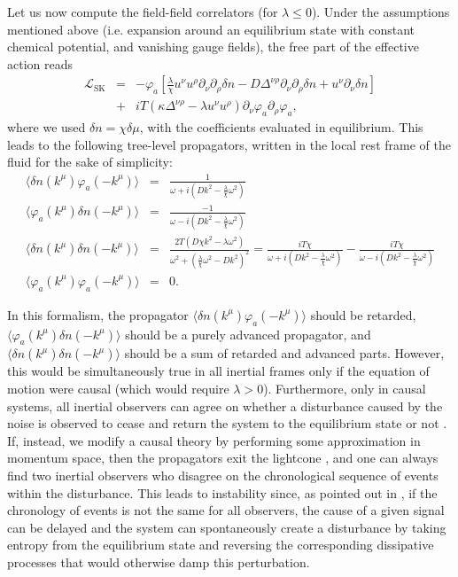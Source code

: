 \documentclass[aps,prd,nofootinbib,amsmath,amssymb,showpacs,longbibliography,singlecolumn,superscriptaddress,notitlepage]{revtex4-1}
\theoremstyle{plain}
\theoremstyle{definition}
\newcommand{\bea}{\begin{eqnarray}}
\newcommand{\eea}{\end{eqnarray}}
\begin{document}
Let us now compute the field-field correlators (for $\lambda \leq 0$). Under the assumptions mentioned above (i.e. expansion around an equilibrium state with constant chemical potential, and vanishing gauge fields),  the free part of the effective action reads
\begin{eqnarray}
    \mathcal{L}_{\mathrm{SK}} &=& -\varphi_a \left[\frac{\lambda}{\chi}  u^\nu u^\rho \partial_\nu\partial_\rho \delta n - D \Delta^{\nu\rho}\partial_\nu\partial_\rho \delta n +  u^\nu \partial_\nu \delta n  \right] \\ \nonumber &+& i T (\kappa \Delta^{\nu\rho}-\lambda u^\nu u^\rho)\partial_\nu \varphi_a \partial_\rho \varphi_a,
    \label{SKaction}
    \end{eqnarray}
where we used $\delta n = \chi \delta \mu$, with the coefficients evaluated in equilibrium. This leads to the following tree-level propagators, written in the local rest frame of the fluid for the sake of simplicity:
\bea
\langle \delta n(k^{\mu})\varphi_a(-k^{\mu})\rangle &=& \frac{1}{\omega + i \left(D k^2 - \frac{\lambda}{\chi}\omega^2\right)}\nonumber \\
\langle \varphi_a(k^{\mu}) \delta n(-k^{\mu})\rangle &=& \frac{-1}{\omega - i \left(D k^2 - \frac{\lambda}{\chi}\omega^2\right)}\nonumber \\
\langle \delta n(k^{\mu}) \delta n(-k^{\mu})\rangle &=& \frac{2T\left(D \chi k^2-\lambda \omega^2\right)}{\omega^2 + \left(\frac{\lambda}{\chi}\omega^2-D k^2\right)^2} = \frac{i T\chi}{\omega + i \left(D k^2 - \frac{\lambda}{\chi}\omega^2\right)}-\frac{i T\chi}{\omega -i \left(D k^2 - \frac{\lambda}{\chi}\omega^2\right)}\nonumber \\ 
\langle \varphi_a(k^{\mu}) \varphi_a(-k^{\mu})\rangle &=& 0.
\label{propagators}
\eea

In this formalism, the propagator $\langle \delta n(k^{\mu}) \varphi_a(-k^{\mu})\rangle$ should be retarded,  $\langle \varphi_a(k^{\mu}) \delta n(-k^{\mu})\rangle$ should be a purely advanced propagator, and $\langle \delta n(k^{\mu}) \delta n(-k^{\mu})\rangle$ should be a sum of retarded and advanced parts. However, this would be simultaneously true in all inertial frames only if the equation of motion were causal (which would require $\lambda>0$). Furthermore, only in causal systems, all inertial observers can agree on whether a disturbance caused by the noise is observed to cease and return the system to the equilibrium state or not \cite{Gavassino:2021owo}. If, instead, we modify a causal theory by performing some approximation in momentum space, then the propagators exit the lightcone \cite{Gavassino2023dispersion}, and one can always find two inertial observers who disagree on the chronological sequence of events within the disturbance. This leads to instability since, as pointed out in \cite{Gavassino:2021owo}, if the chronology of events is not the same for all observers, the cause of a given signal can be delayed and the system can spontaneously create a disturbance by taking entropy from the equilibrium state and reversing
the corresponding dissipative processes that would otherwise damp this perturbation. 
\end{document}
